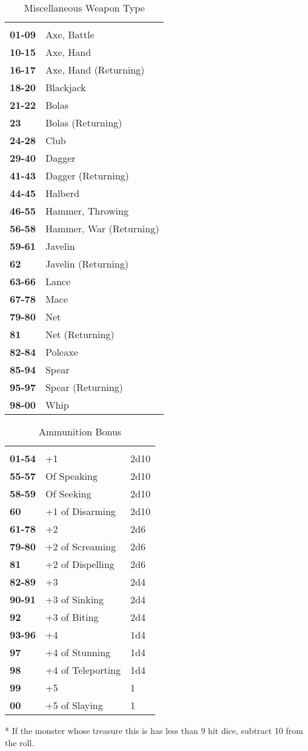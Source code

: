 \begin{multicols*}{2}
\begin {table}[H]
  \caption{Miscellaneous Weapon Type}\label{tab:Miscellaneous Weapon Type}
  \begin{tabularx}{\columnwidth}{>{\bfseries}YY}
	 & \\
	01-09 & Axe, Battle\\
	10-15 & Axe, Hand\\
	16-17 & Axe, Hand (Returning)\\
	18-20 & Blackjack\\
	21-22 & Bolas\\
	23 & Bolas (Returning)\\
	24-28 & Club\\
	29-40 & Dagger\\
	41-43 & Dagger (Returning)\\
	44-45 & Halberd\\
	46-55 & Hammer, Throwing\\
	56-58 & Hammer, War (Returning)\\
	59-61 & Javelin\\
	62 & Javelin (Returning)\\
	63-66 & Lance\\
	67-78 & Mace\\
	79-80 & Net\\
	81 & Net (Returning)\\
	82-84 & Poleaxe\\
	85-94 & Spear\\
	95-97 & Spear (Returning)\\
	98-00 & Whip
  \end {tabularx}
\end {table}

\begin {table}[H]
  \caption{Ammunition Bonus}\label{tab:Ammunition Bonus}
  \begin{tabularx}{\columnwidth}{>{\bfseries}YYY}
	 &  & \\
	01-54 & +1 & 2d10\\
	55-57 & Of Speaking & 2d10\\
	58-59 & Of Seeking & 2d10\\
	60 & +1 of Disarming & 2d10\\
	61-78 & +2 & 2d6\\
	79-80 & +2 of Screaming & 2d6\\
	81 & +2 of Dispelling & 2d6\\
	82-89 & +3 & 2d4\\
	90-91 & +3 of Sinking & 2d4\\
	92 & +3 of Biting & 2d4\\
	93-96 & +4 & 1d4\\
	97 & +4 of Stunning & 1d4\\
	98 & +4 of Teleporting & 1d4\\
	99 & +5 & 1\\
	00 & +5 of Slaying & 1\
  \end {tabularx}
	* If the monster whose treasure this is has less than 9 hit dice, subtract 10 from the roll.
\end {table}


\end{multicols*}
